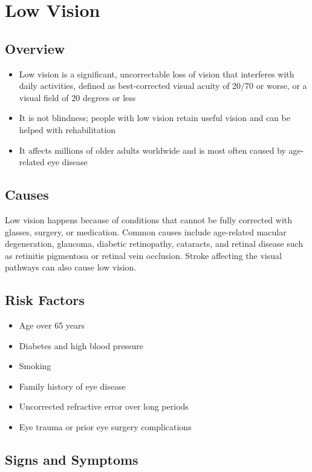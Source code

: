 \chapter{Low Vision}
\label{sec:Low Vision}

\section{Overview}
\begin{itemize}[noitemsep]
  \item Low vision is a significant, uncorrectable loss of vision that interferes with daily activities, defined as best-corrected visual acuity of 20/70 or worse, or a visual field of 20 degrees or less
  \item It is not blindness; people with low vision retain useful vision and can be helped with rehabilitation
  \item It affects millions of older adults worldwide and is most often caused by age-related eye disease
\end{itemize}
\section{Causes}
Low vision happens because of conditions that cannot be fully corrected with glasses, surgery, or medication. Common causes include age-related macular degeneration, glaucoma, diabetic retinopathy, cataracts, and retinal disease such as retinitis pigmentosa or retinal vein occlusion. Stroke affecting the visual pathways can also cause low vision.
\section{Risk Factors}
\begin{itemize}[noitemsep]
  \item Age over 65 years
  \item Diabetes and high blood pressure
  \item Smoking
  \item Family history of eye disease
  \item Uncorrected refractive error over long periods
  \item Eye trauma or prior eye surgery complications
\end{itemize}
\section{Signs and Symptoms}
